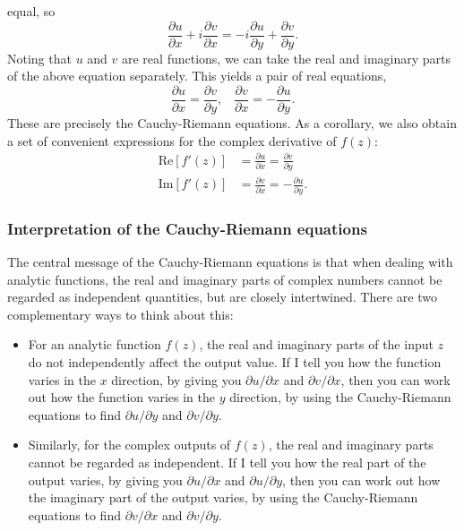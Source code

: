 \documentclass[10pt,a4paper]{article}
\begin{document}
equal, so
\begin{equation}
\frac{\partial u}{\partial x} + i \frac{\partial v}{\partial x} = -i\frac{\partial u}{\partial y} + \frac{\partial v}{\partial y}.
\end{equation}
Noting that $u$ and $v$ are real functions, we can take the real and
imaginary parts of the above equation separately. This yields a pair of
real equations,
\begin{equation}
\frac{\partial u}{\partial x} = \frac{\partial v}{\partial y}, \;\;\; \frac{\partial v}{\partial x} = -\frac{\partial u}{\partial y}.
\end{equation}
These are precisely the Cauchy-Riemann equations. As a corollary, we
also obtain a set of convenient expressions for the complex derivative
of $f(z)$:
\begin{equation}
\begin{aligned}\mathrm{Re}\left[f'(z)\right] &= \frac{\partial u}{\partial x} = \frac{\partial v}{\partial y} \\ \mathrm{Im}\left[f'(z)\right] &= \frac{\partial v}{\partial x} = -\frac{\partial u}{\partial y}.\end{aligned}
\end{equation}

\subsubsection{Interpretation of the Cauchy-Riemann equations}
\label{interpretation-of-the-cauchy-riemann-equations}

The central message of the Cauchy-Riemann equations is that when dealing
with analytic functions, the real and imaginary parts of complex numbers
cannot be regarded as independent quantities, but are closely
intertwined. There are two complementary ways to think about this:

\begin{itemize}
\item
  For an analytic function $f(z)$, the real and imaginary parts of the
  input $z$ do not independently affect the output value. If I tell
  you how the function varies in the $x$ direction, by giving you
  $\partial u/\partial x$ and $\partial v/\partial x$, then you can
  work out how the function varies in the $y$ direction, by using the
  Cauchy-Riemann equations to find $\partial u/\partial y$ and
  $\partial v/\partial y$.
\item
  Similarly, for the complex outputs of $f(z)$, the real and imaginary
  parts cannot be regarded as independent. If I tell you how the real
  part of the output varies, by giving you $\partial u/\partial x$ and
  $\partial u/\partial y$, then you can work out how the imaginary
  part of the output varies, by using the Cauchy-Riemann equations to
  find $\partial v/\partial x$ and $\partial v/\partial y$.
\end{itemize}
\end{document}
